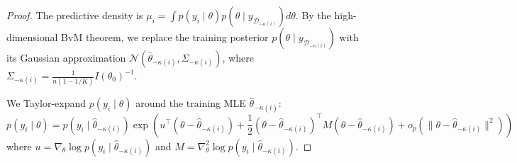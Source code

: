 \documentclass[12pt]{article}
\begin{document}
\begin{proof}
The predictive density is $\mu_i = \int p(y_i \mid \theta) p(\theta \mid y_{\mathcal{D}_{-\kappa(i)}}) d\theta$.
By the high-dimensional BvM theorem, we replace the training posterior $p(\theta \mid y_{\mathcal{D}_{-\kappa(i)}})$ with its Gaussian approximation $\mathcal{N}(\hat{\theta}_{-\kappa(i)}, \Sigma_{-\kappa(i)})$, where $\Sigma_{-\kappa(i)} = \frac{1}{n(1 - 1/K)} I(\theta_0)^{-1}$.

We Taylor-expand $p(y_i \mid \theta)$ around the training MLE $\hat{\theta}_{-\kappa(i)}$:
\[
p(y_i \mid \theta) = p(y_i \mid \hat{\theta}_{-\kappa(i)}) \exp\left( u^\top (\theta - \hat{\theta}_{-\kappa(i)}) + \frac{1}{2} (\theta - \hat{\theta}_{-\kappa(i)})^\top M (\theta - \hat{\theta}_{-\kappa(i)}) + o_p(\|\theta - \hat{\theta}_{-\kappa(i)}\|^2) \right)
\]
where $u = \nabla_\theta \log p(y_i \mid \hat{\theta}_{-\kappa(i)})$ and $M = \nabla^2_\theta \log p(y_i \mid \hat{\theta}_{-\kappa(i)})$.


\end{proof}
\end{document}
